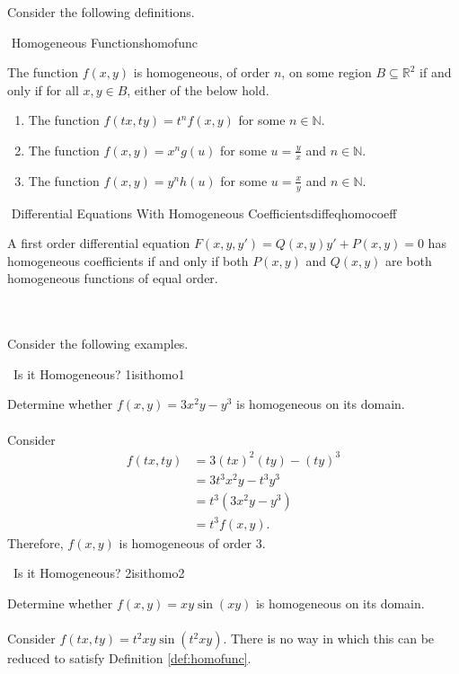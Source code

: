     Consider the following definitions.
    \begin{definition}{\Stop\,\,Homogeneous Functions}{homofunc}

        The function \(f(x,y)\) is homogeneous, of order \(n\), on some region \(B\subseteq\mathbb{R}^2\) if and only if for all \(x,y\in B\), either of the below hold.
        \begin{enumerate}
            \item The function \(f(tx,ty)=t^nf(x,y)\) for some \(n\in\mathbb{N}\).
            \item The function \(f(x,y)=x^ng(u)\) for some \(u=\frac{y}{x}\) and \(n\in\mathbb{N}\).
            \item The function \(f(x,y)=y^nh(u)\) for some \(u=\frac{x}{y}\) and \(n\in\mathbb{N}\).
        \end{enumerate}

    \end{definition}
    \begin{definition}{\Stop\,\,Differential Equations With Homogeneous Coefficients}{diffeqhomocoeff}

        A first order differential equation \(F(x,y,y')=Q(x,y)y'+P(x,y)=0\) has homogeneous coefficients if and only if both \(P(x,y)\) and \(Q(x,y)\) are both homogeneous functions of equal order.
        
    \end{definition}
    \vphantom
    \\
    \\
    Consider the following examples.
    \begin{example}{\Difficulty\,\Difficulty\,\,Is it Homogeneous? 1}{isithomo1}

        Determine whether \(f(x,y)=3x^2y-y^3\) is homogeneous on its domain.
        \\
        \\
        Consider
        \begin{align*}
            f(tx,ty)&=3(tx)^2(ty)-(ty)^3 \\
            &=3t^3x^2y-t^3y^3 \\
            &=t^3(3x^2y-y^3) \\
            &=t^3f(x,y).
        \end{align*}
        Therefore, \(f(x,y)\) is homogeneous of order \(3\).

    \end{example}
    \begin{example}{\Difficulty\,\Difficulty\,\,Is it Homogeneous? 2}{isithomo2}

        Determine whether \(f(x,y)=xy\sin(xy)\) is homogeneous on its domain.
        \\
        \\
        Consider \(f(tx,ty)=t^2xy\sin(t^2xy)\). There is no way in which this can be reduced to satisfy Definition \ref{def:homofunc}.
    \end{example}
